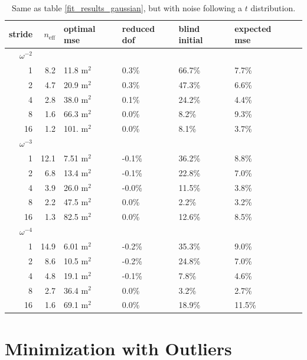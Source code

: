 \documentclass{ametsoc}
\begin{document}
\begin{table}[ht]
\caption{Same as table \ref{fit_results_gaussian}, but with noise following a $t$ distribution.}
\label{fit_results_tdistribution}
\centering
\begin{tabular}{r r p{1cm} | p{1cm}p{1cm}p{1cm}p{1cm}} stride & $n_\textrm{eff}$ & optimal mse & reduced dof & blind initial & expected mse \\ \hline \hline 
$\omega^{-2}$ &&&&&  \\ \hline 
1 & 8.2 & 11.8 m$^2$ &  0.3\%  &  66.7\%  &  7.7\%  \\ 
2 & 4.7 & 20.9 m$^2$ &  0.3\%  &  47.3\%  &  6.6\%  \\ 
4 & 2.8 & 38.0 m$^2$ &  0.1\%  &  24.2\%  &  4.4\%  \\ 
8 & 1.6 & 66.3 m$^2$ &  0.0\%  &  8.2\%  &  9.3\%  \\ 
16 & 1.2 & 101. m$^2$ &  0.0\%  &  8.1\%  &  3.7\%  \\ 
$\omega^{-3}$ &&&&&  \\ \hline 
1 & 12.1 & 7.51 m$^2$ &  -0.1\%  &  36.2\%  &  8.8\%  \\ 
2 & 6.8 & 13.4 m$^2$ &  -0.1\%  &  22.8\%  &  7.0\%  \\ 
4 & 3.9 & 26.0 m$^2$ &  -0.0\%  &  11.5\%  &  3.8\%  \\ 
8 & 2.2 & 47.5 m$^2$ &  0.0\%  &  2.2\%  &  3.2\%  \\ 
16 & 1.3 & 82.5 m$^2$ &  0.0\%  &  12.6\%  &  8.5\%  \\ 
$\omega^{-4}$ &&&&&  \\ \hline 
1 & 14.9 & 6.01 m$^2$ &  -0.2\%  &  35.3\%  &  9.0\%  \\ 
2 & 8.6 & 10.5 m$^2$ &  -0.2\%  &  24.8\%  &  7.0\%  \\ 
4 & 4.8 & 19.1 m$^2$ &  -0.1\%  &  7.8\%  &  4.6\%  \\ 
8 & 2.7 & 36.4 m$^2$ &  0.0\%  &  3.2\%  &  2.7\%  \\ 
16 & 1.6 & 69.1 m$^2$ &  0.0\%  &  18.9\%  &  11.5\%  \\ 
\end{tabular} 
\end{table}



\section{Minimization with Outliers}
\label{sec:outliers}
\end{document}
